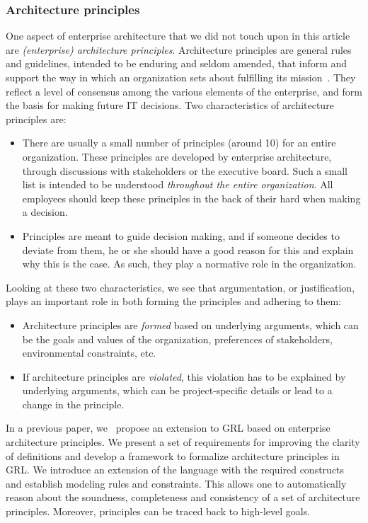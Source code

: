 

\subsubsection*{Architecture principles} 
One aspect of enterprise architecture that we did not touch upon in this article are \emph{(enterprise) architecture principles}. Architecture principles are general rules and guidelines, intended to be enduring and seldom amended, that inform and support the way in which an organization sets about fulfilling its mission~\cite{Lankhorst2005,OptLand2007a,OG2009}. They reflect a level of consensus among the various elements of the enterprise, and form the basis for making future IT decisions. Two characteristics of architecture principles are:
\begin{itemize}
\item There are usually a small number of principles (around 10) for an entire organization. These principles are developed by enterprise architecture, through discussions with stakeholders or the executive board. Such a small list is intended to be understood \emph{throughout the entire organization}. All employees should keep these principles in the back of their hard when making a decision.
\item Principles are meant to guide decision making, and if someone decides to deviate from them, he or she should have a good reason for this and explain why this is the case. As such, they play a normative role in the organization.
\end{itemize}

Looking at these two characteristics, we see that argumentation, or justification, plays an important role in both forming the principles and adhering to them:
\begin{itemize}
\item Architecture principles are \emph{formed} based on underlying arguments, which can be the goals and values of the organization, preferences of stakeholders, environmental constraints, etc.
\item If architecture principles are \emph{violated}, this violation has to be explained by underlying arguments, which can be project-specific details or lead to a change in the principle.
\end{itemize}

In a previous paper, we~\cite{marosin-etal:caise2016} propose an extension to GRL based on enterprise architecture principles. We present a set of requirements for improving the clarity of definitions and develop a framework to formalize architecture principles in GRL. We introduce an extension of the language with the required constructs and establish modeling rules and constraints. This allows one to automatically reason about the soundness, completeness and consistency of a set of architecture principles. Moreover, principles can be traced back to high-level goals.


